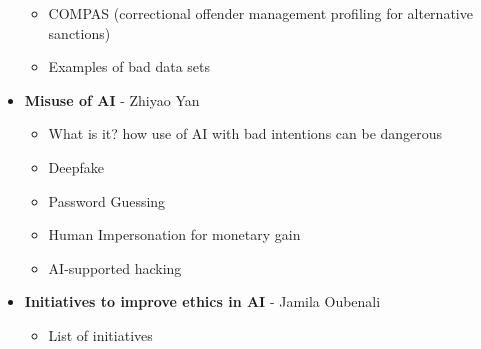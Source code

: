 \documentclass[12pt]{article}
\begin{document}
\begin{itemize}[label=$\bullet$]
\begin{itemize}[label=$\circ$]
         \item COMPAS (correctional offender management profiling for alternative sanctions)
         \item Examples of bad data sets
     \end{itemize}
    \item \textbf{Misuse of AI} - Zhiyao Yan
     \begin{itemize}[label=$\circ$]
         \item What is it? how use of AI with bad intentions can be dangerous
         \item Deepfake
         \item Password Guessing
         \item Human Impersonation for monetary gain
         \item AI-supported hacking
     \end{itemize}
    \item \textbf{Initiatives to improve ethics in AI} - Jamila Oubenali
     \begin{itemize}[label=$\circ$]
         \item List of initiatives
     \end{itemize}
\end{itemize}
\end{document}
